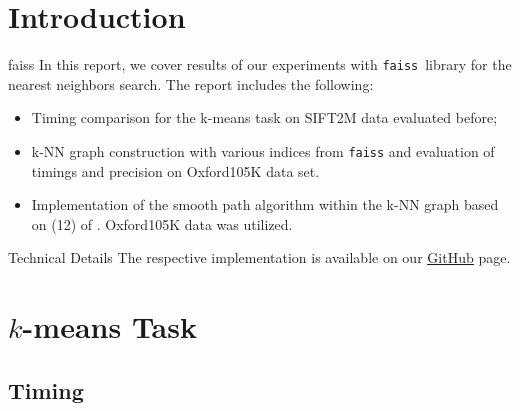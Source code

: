 \section{Introduction}

\begin{frame}
	\begin{block}{faiss}
		In this report, we cover results of our experiments with \texttt{faiss}\footnotemark \, library \cite{Johnson2017} for the nearest neighbors search. The report includes the following:
		\begin{itemize}
			\item Timing comparison for the k-means task on SIFT2M data evaluated before;
			\item k-NN graph construction with various indices from \texttt{faiss} and evaluation of timings and precision on Oxford105K data set.
			\item Implementation of the smooth path algorithm within the k-NN graph based on (12) of \cite{Johnson2017}. Oxford105K data was utilized.
		\end{itemize}
	\end{block}
	
	\begin{block}{Technical Details}
		The respective implementation is available on our \href{https://github.com/salisaresama/computer-vision}{{\color{blue}\underline{GitHub}}} page.
	\end{block}
	
	\addtocounter{footnote}{-1}
\end{frame}


\section{$k$-means Task}
\subsection{Timing}


